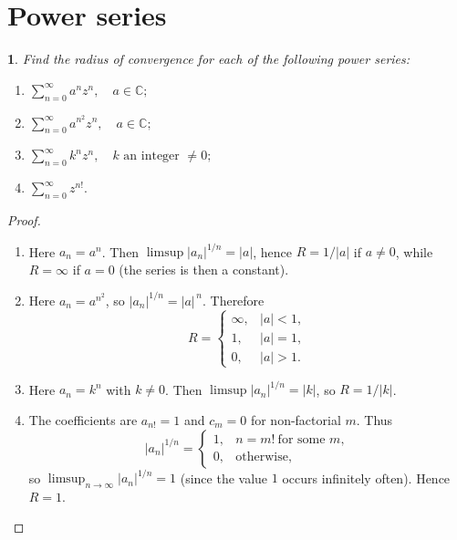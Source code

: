 \documentclass[12pt, a4paper]{report}
\theoremstyle{spaced}
\newtheorem{exercise}{}
\newcommand{\setexercise}[1]{\setcounter{exercise}{#1-1}}
\begin{document}
\section{Power series}

\setexercise{6}
\begin{exercise}
	Find the radius of convergence for each of the following power series:

	\begin{enumerate}[label=(\alph*)]
		\item $\displaystyle \sum_{n=0}^{\infty} a^n z^n, \quad a \in \mathbb{C};$
		\item $\displaystyle \sum_{n=0}^{\infty} a^{n^2} z^n, \quad a \in \mathbb{C};$
		\item $\displaystyle \sum_{n=0}^{\infty} k^n z^n, \quad k \text{ an integer } \neq 0;$
		\item $\displaystyle \sum_{n=0}^{\infty} z^{n!}.$
	\end{enumerate}

\end{exercise}

\begin{proof}
	\begin{enumerate}[label=(\alph*), leftmargin=2em]
		\item Here $a_n=a^n$. Then $\limsup |a_n|^{1/n}=|a|$, hence $R=1/|a|$ if $a\neq 0$, while $R=\infty$ if $a=0$ (the series is then a constant).

		\item Here $a_n=a^{n^2}$, so $|a_n|^{1/n}=|a|^{\,n}$. Therefore
		      \[
			      R=\begin{cases}
				      \infty, & |a|<1, \\
				      1,      & |a|=1, \\
				      0,      & |a|>1.
			      \end{cases}
		      \]

		\item Here $a_n=k^n$ with $k\neq 0$. Then $\limsup |a_n|^{1/n}=|k|$, so $R=1/|k|$.

		\item The coefficients are $a_{n!}=1$ and $c_m=0$ for non-factorial $m$. Thus
		      \[
			      |a_n|^{1/n}=
			      \begin{cases}
				      1, & n=m!\ \text{for some }m, \\
				      0, & \text{otherwise},
			      \end{cases}
		      \]
		      so $\limsup_{n\to\infty} |a_n|^{1/n}=1$ (since the value $1$ occurs infinitely often). Hence $R=1$.
	\end{enumerate}
\end{proof}
\end{document}
